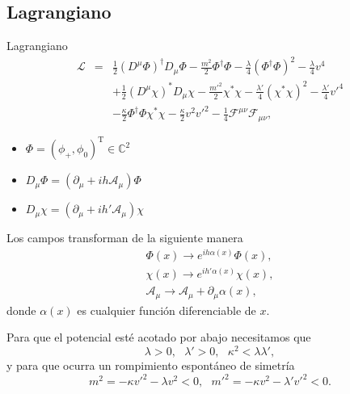 \documentclass[14pt]{beamer}
\begin{document}
\subsection{Lagrangiano}
\begin{frame}{Lagrangiano}
\begin{eqnarray*} 
\mathcal{L} & = & \frac{1}{2}(D^{\mu}\Phi)^{\dagger}D_{\mu}\Phi - \frac{m^2}{2}\Phi^{\dagger}\Phi - \frac{\lambda}{4}(\Phi^{\dagger}\Phi)^2 -\frac{\lambda}{4}v^4   \nonumber\\
 & & +\frac{1}{2}(D^{\mu} \chi)^*D_{\mu} \chi - \frac{m'^2}{2}\chi^*\chi - \frac{\lambda'}{4}(\chi^* \chi)^2 -\frac{\lambda'}{4}v'^4\nonumber \\ 
 & & -\frac{\kappa}{2}\Phi^\dagger\Phi\chi^*\chi  -\frac{\kappa}{2}v^2v'^2 -\frac{1}{4}\mathcal{F}^{\mu\nu}\mathcal{F}_{\mu\nu}, %
\end{eqnarray*}

\begin{itemize}
	\item $\Phi = (\phi_+,\phi_0)^{\text{T}} \in \mathbb{C}^2$
	\item $D_{\mu} \Phi = (\partial_{\mu} + ih\mathcal{A}_{\mu})\Phi$
	\item $D_{\mu} \chi = (\partial_{\mu} + ih'\mathcal{A}_{\mu})\chi$
\end{itemize}
\end{frame}

\begin{frame}


Los campos transforman de la siguiente manera
\begin{eqnarray*}
	\Phi(x) \to e^{ih\alpha(x)}\Phi(x), \nonumber \\
	\chi(x) \to e^{ih'\alpha(x)}\chi(x), \nonumber\\
	\mathcal{A}_{\mu} \to \mathcal{A}_{\mu} + \partial_{\mu} \alpha(x),
\end{eqnarray*}
donde $\alpha(x)$ es cualquier función diferenciable de $x$.
\end{frame}

\begin{frame}
Para que el potencial esté acotado por abajo necesitamos que
\begin{equation*}
	\lambda>0, \ \ \ \lambda'>0, \ \ \ \kappa^2 < \lambda \lambda',
\end{equation*}
y para que ocurra un rompimiento espontáneo de simetría
\begin{equation*}
 m^2 = -\kappa v'^2 - \lambda v^2<0,\ \ \ m'^2 = -\kappa v^2 - \lambda' v'^2<0.
\end{equation*}

\end{frame}
\end{document}
